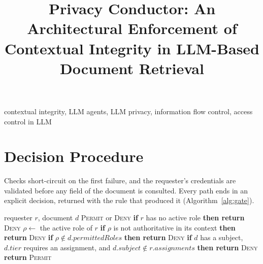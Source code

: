 \documentclass[conference]{IEEEtran}
\begin{document}
\title{Privacy Conductor: An Architectural Enforcement of Contextual Integrity in LLM-Based Document Retrieval}

\author{
}


\maketitle
\begin{abstract}


\end{abstract}
\begin{IEEEkeywords}
contextual integrity, LLM agents, LLM privacy, information flow control, access control in LLM
\end{IEEEkeywords}







%

\appendices

\section{Decision Procedure}
\label{app:alg}
Checks short-circuit on the first failure, and the requester's credentials are
validated before any field of the document is consulted. Every path ends in an
explicit decision, returned with the rule that produced it
(Algorithm~\ref{alg:gate}).

\begin{algorithm}[h]
\caption{Gate decision for requester $r$ and document $d$}
\label{alg:gate}
\begin{algorithmic}[1]
\Require requester $r$, document $d$
\Ensure \textsc{Permit} or \textsc{Deny}
\State \textbf{if} $r$ has no active role \textbf{then return} \textsc{Deny}
\State $\rho \gets$ the active role of $r$
\State \textbf{if} $\rho$ is not authoritative in its context
  \textbf{then return} \textsc{Deny}
\State \textbf{if} $\rho \notin d.\mathit{permittedRoles}$
  \textbf{then return} \textsc{Deny}
\State \textbf{if} $d$ has a subject, $d.\mathit{tier}$ requires an
  assignment, and $d.\mathit{subject} \notin r.\mathit{assignments}$
  \textbf{then return} \textsc{Deny}
\State \textbf{return} \textsc{Permit}
\end{algorithmic}
\end{algorithm}
\end{document}
